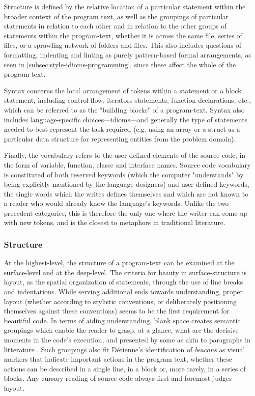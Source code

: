 Structure is defined by the relative location of a particular statement within the broader context of the program text, as well as the groupings of particular statements in relation to each other and in relation to the other groups of statements within the program-text, whether it is across the same file, series of files, or a sprawling network of folders and files. This also includes questions of formatting, indenting and linting as purely pattern-based formal arrangements, as seen in \ref{subsec:style-idioms-programming}, since these affect the whole of the program-text.

Syntax concerns the local arrangement of tokens within a statement or a block statement, including control flow, iterators statements, function declarations, etc., which can be referred to as the "building blocks" of a program-text. Syntax also includes language-specific choices—idioms—and generally the type of statements needed to best represent the task required (e.g. using an array or a struct as a particular data structure for representing entities from the problem domain).

Finally, the vocabulary refers to the user-defined elements of the source code, in the form of variable, function, classe and interface names. Source code vocabulary is constituted of both reserved keywords (which the computer "understands" by being explicitly mentioned by the language designers) and user-defined keywords, the single words which the writes defines themselves and which are not known to a reader who would already know the language's keywords. Unlike the two precedent categories, this is therefore the only one where the writer can come up with new tokens, and is the closest to metaphors in traditional literature.

\subsubsection{Structure}
\label{subsubsec:framework-structure}

At the highest-level, the structure of a program-text can be examined at the surface-level and at the deep-level. The criteria for beauty in surface-structure is layout, as the spatial organization of statements, through the use of line breaks and indentations. While serving additional ends towards understanding, proper layout (whether according to stylistic conventions, or deliberately positioning themselves against these conventions) seems to be the first requirement for beautiful code. In terms of aiding understanding, blank space creates semantic groupings which enable the reader to grasp, at a glance, what are the decisive moments \citep{sennett_craftsman_2009} in the code's execution, and presented by some as akin to paragraphs in litterature \citep{matsumoto_treating_2007}. Such groupings also fit Détienne's identification of \emph{beacons} \citep{detienne_software_2001} as visual markers that indicate important actions in the program text, whether these actions can be described in a single line, in a block or, more rarely, in a series of blocks. Any cursory reading of source code always first and foremost judges layout.


